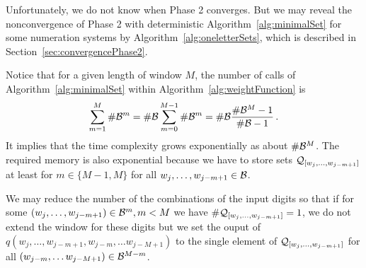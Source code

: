 \begin{upravit}
Unfortunately, we do not know when Phase 2 converges. But  we may reveal the nonconvergence of Phase 2 with deterministic Algorithm~\ref{alg:minimalSet} for some numeration systems by Algorithm~\ref{alg:oneletterSets}, which is described in Section~\ref{sec:convergencePhase2}.



Notice that for a given length of window $M$, the number of calls of Algorithm~\ref{alg:minimalSet} within Algorithm~\ref{alg:weightFunction} is
$$
\sum_{m=1}^M  \#\mathcal{B}^m = \#\mathcal{B} \sum_{m=0}^{M-1}  \#\mathcal{B}^m = \#\mathcal{B} \frac{\#\mathcal{B}^M-1}{\#\mathcal{B}-1}\,.
$$    
It implies that the time complexity grows exponentially as about $\#\mathcal{B}^M$. The required memory is also exponential because we have to store sets $\mathcal{Q}_{[w_j,\dots, w_{j-m+1}]}$ at least for $m\in\{M-1,M\}$  for all $w_j,\dots, w_{j-m+1} \in \mathcal{B}$.

We may reduce the number of the combinations of the input digits so that if for some $(w_j,\dots, w_{j-m+1})\in\mathcal{B}^m, m<M$ we have   $\#\mathcal{Q}_{[w_j,\dots, w_{j-m+1}]}=1$, we do not extend the window for these digits but we set the ouput of $q(w_j,\dots, w_{j-m+1}, w_{j-m}, \dots w_{j-M+1})$ to the single element of $\mathcal{Q}_{[w_j,\dots, w_{j-m+1}]}$ for all $(w_{j-m}, \dots w_{j-M+1})\in \mathcal{B}^{M-m}$. 
\end{upravit}